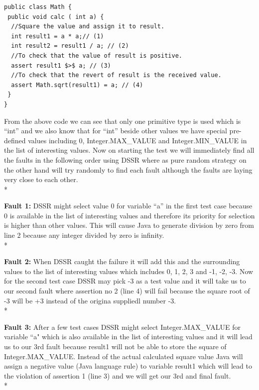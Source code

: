 \documentclass[10pt, conference, compsocconf]{IEEEtran}
\begin{document}
{\small
\begin{verbatim}
public class Math {
 public void calc ( int a) {
  //Square the value and assign it to result.
  int result1 = a * a;// (1)
  int result2 = result1 / a; // (2)
  //To check that the value of result is positive.
  assert result1 $>$ a; // (3)
  //To check that the revert of result is the received value.
  assert Math.sqrt(result1) = a; // (4)
 }
}
\end{verbatim}
}

From the above code we can see that only one primitive type is used which is ``int'' and we also know that for ``int'' beside other values we have special pre-defined values including 0, Integer.MAX\_VALUE and Integer.MIN\_VALUE in the list of interesting values. Now on starting the test we will immediately find all the faults in the following order using DSSR where as pure random strategy on the other hand will try randomly to find each fault although the faults are laying very close to each other.\\*



\textbf{Fault 1:} DSSR might select value 0 for variable ``a''  in the first test case because 0 is available in the list of interesting values and therefore its priority for selection is higher than other values. This will cause Java to generate division by zero from line 2 because any integer divided by zero is infinity.\\*

\textbf{Fault 2:} When DSSR caught the failure it will add this and the surrounding values to the list of interesting values which includes 0, 1, 2, 3 and -1, -2, -3. Now for the second test case DSSR may pick -3 as a test value and it will take us to our second fault where assertion no 2 (line 4) will fail because the square root of -3 will be +3 instead of the origina suppliedl number -3.\\*

\textbf{Fault 3:} After a few test cases DSSR might select Integer.MAX\_VALUE for variable ``a" which is also available in the list of interesting values and it will lead us to our 3rd fault because result1 will not be able to store the square of Integer.MAX\_VALUE. Instead of the actual calculated square value Java will assign a negative value (Java language rule) to variable result1 which will lead to the violation of assertion 1 (line 3) and we will get our 3rd and final fault.\\*
\end{document}
